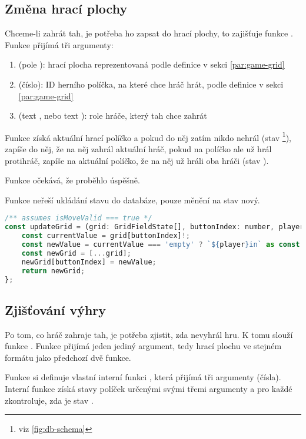 \subsection{Změna hrací plochy}
Chceme-li zahrát tah, je potřeba ho zapsat do hrací plochy, to zajišťuje funkce
. Funkce přijímá tři argumenty:
\begin{enumerate}
    \item {} (pole ): hrací plocha reprezentovaná podle
        definice v sekci \ref{par:game-grid}
    \item {} (číslo): ID herního políčka, na které chce hráč hrát,
        podle definice v sekci \ref{par:game-grid}
    \item {} (text , nebo text ): role hráče,
        který tah chce zahrát
\end{enumerate}

Funkce získá aktuální hrací políčko a pokud do něj zatím nikdo nehrál (stav
\footnote{viz \ref{fig:db-schema}}), zapíše do něj, že na něj zahrál
aktuální hráč, pokud na políčko ale už hrál protihráč, zapíše na aktuální
políčko, že na něj už hráli oba hráči (stav ).

Funkce očekává, že  proběhlo úspěšně.

Funkce neřeší ukládání stavu do databáze, pouze měnění na stav nový.

\begin{lstlisting}[language=JavaScript,caption={Funkce \M{updateGrid}},label={lst:update-grid}]
/** assumes isMoveValid === true */
const updateGrid = (grid: GridFieldState[], buttonIndex: number, player: 'player1' | 'player2') => {
    const currentValue = grid[buttonIndex]!;
    const newValue = currentValue === 'empty' ? `${player}in` as const : 'both';
    const newGrid = [...grid];
    newGrid[buttonIndex] = newValue;
    return newGrid;
};
\end{lstlisting}

\subsection{Zjišťování výhry}
Po tom, co hráč zahraje tah, je potřeba zjistit, zda nevyhrál hru. K tomu
slouží funkce . Funkce přijímá jeden jediný argument, tedy hrací
plochu ve stejném formátu jako předchozí dvě funkce.

Funkce si definuje vlastní interní funkci , která přijímá tři
argumenty (čísla). Interní funkce získá stavy políček určenými svými třemi
argumenty a pro každé zkontroluje, zda je stav .

